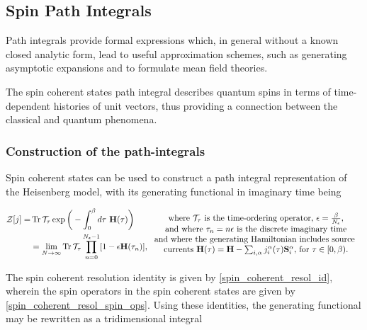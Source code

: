 \subsection{Spin Path Integrals}

Path integrals provide formal expressions which, in general without a known closed analytic form, lead to useful approximation schemes, such as generating asymptotic expansions and to formulate mean field theories. 

The spin coherent states path integral describes quantum spins in terms of time-dependent histories of unit vectors, thus providing a connection between the classical and quantum phenomena. \bigbreak

\subsubsection{Construction of the path-integrals}

Spin coherent states can be used to construct a path integral representation of the Heisenberg model, with its generating functional in imaginary time being 

\begin{equation}
\begin{split}
    \mathcal{Z}[j] =& \Tr \mathcal{T}_{\tau} \exp \bigg(-\int_{0}^\beta d\tau \textnormal{ } {\bf H}(\tau)\bigg)  \\
    &= \lim_{N \rightarrow \infty} \Tr \mathcal{T}_{\tau} \prod_{n=0}^{N_{\epsilon} - 1} [1-\epsilon {\bf H}(\tau_n)],
\end{split} \begin{array}{cc}
         \textnormal{ where $\mathcal{T}_\tau$ is the time-ordering operator, $\epsilon = \frac{\beta}{N_{\epsilon}}$,}  \\
         \textnormal{  and where $\tau_n = n \epsilon$ is the discrete imaginary time} \\
         \textnormal{ and where the generating Hamiltonian includes source } \\
         \textnormal{ currents ${\bf H}(\tau) = {\bf H} - \sum_{i, \alpha} j_i^\alpha(\tau) {\bf S}_i^\alpha$, for $\tau \in [0, \beta).$}
    \end{array}
\end{equation}

The spin coherent resolution identity is given by \cref{spin_coherent_resol_id}, wherein the spin operators in the spin coherent states are given by \cref{spin_coherent_resol_spin_ops}. Using these identities, the generating functional may be rewritten as a tridimensional integral

